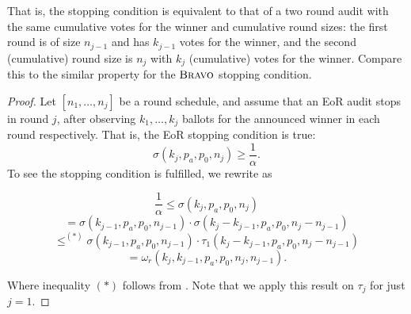 That is, the stopping condition is equivalent to that of a two round audit with the same cumulative votes for the winner and cumulative round sizes: the first round is of size $n_{j-1}$ and has $k_{j-1}$ votes for the winner, and the second (cumulative) round size is $n_j$ with $k_j$ (cumulative) votes for the winner. Compare this to the similar property for the $\textsc{Bravo}$ stopping condition. 

\efficiencylemma

\begin{proof}
\label{pf:efficiency_proof}
Let $[n_1, \ldots, n_j]$ be a round schedule, and assume that an EoR \BRAVO audit stops in round $j$, after observing $k_1, \ldots, k_j$ ballots for the announced winner in each round respectively.
That is, the EoR \BRAVO stopping condition is true:
$$\sigma(k_j,p_a,p_0,n_j) \ge \frac{1}{\alpha}.$$
To see the \Providence stopping condition is fulfilled, we rewrite as 




\[
 \frac{1}{\alpha} \leq \sigma(k_{j}, p_a, p_0, n_{j}) 
\]
\[
 = \sigma(k_{j-1}, p_a, p_0, n_{j-1}) \cdot \sigma(k_j - k_{j-1}, p_a, p_0, n_j - n_{j-1})  
\]
\[
 \leq^{(*)} \sigma(k_{j-1}, p_a, p_0, n_{j-1}) \cdot \tau_1(k_j - k_{j-1}, p_a, p_0, n_j - n_{j-1}) 
\]
\[
 = \omega_r(k_j, k_{j-1}, p_a, p_0, n_j, n_{j-1}).
\]

Where inequality $(*)$ follows from \cite[Theorem 6]{arxiv_athena}. Note that we apply this result on $\tau_j$ for just $j=1$.


% 
% 
% 
\end{proof}
